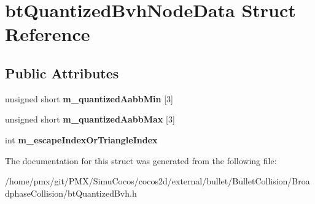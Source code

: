 \hypertarget{structbtQuantizedBvhNodeData}{}\section{bt\+Quantized\+Bvh\+Node\+Data Struct Reference}
\label{structbtQuantizedBvhNodeData}
\subsection*{Public Attributes}
\begin{DoxyCompactItemize}
\item 
\mbox{\label{structbtQuantizedBvhNodeData_aad0350a65b31262d6bc7e0ff75a440fa}} 
unsigned short {\bfseries m\+\_\+quantized\+Aabb\+Min} \mbox{[}3\mbox{]}
\item 
\mbox{\label{structbtQuantizedBvhNodeData_a7607e656d64251b72c2c24bb00b7c629}} 
unsigned short {\bfseries m\+\_\+quantized\+Aabb\+Max} \mbox{[}3\mbox{]}
\item 
\mbox{\label{structbtQuantizedBvhNodeData_a1af8a825fe24ebe47229c3fd72cddf58}} 
int {\bfseries m\+\_\+escape\+Index\+Or\+Triangle\+Index}
\end{DoxyCompactItemize}


The documentation for this struct was generated from the following file\+:\begin{DoxyCompactItemize}
\item 
/home/pmx/git/\+P\+M\+X/\+Simu\+Cocos/cocos2d/external/bullet/\+Bullet\+Collision/\+Broadphase\+Collision/bt\+Quantized\+Bvh.\+h\end{DoxyCompactItemize}

